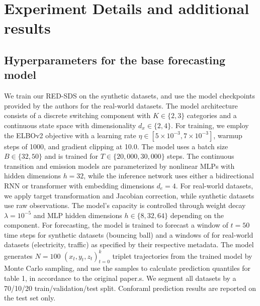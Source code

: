

\newpage
\section{Experiment Details and additional results}
\label{app:exp}

\subsection{Hyperparameters for the base forecasting model}
\label{app:redsds}

We train our RED-SDS on the synthetic datasets, and use the model checkpoints provided by the authors for the real-world datasets. The model architecture consists of a discrete switching component with $K \in \{2,3\}$ categories and a continuous state space with dimensionality $d_x \in \{2,4\}$. For training, we employ the ELBOv2 objective with a learning rate $\eta \in [5\times10^{-3}, 7\times10^{-3}]$, warmup steps of 1000, and gradient clipping at 10.0. The model uses a batch size $B \in \{32,50\}$ and is trained for $T \in \{20,000, 30,000\}$ steps. The continuous transition and emission models are parameterized by nonlinear MLPs with hidden dimensions $h=32$, while the inference network uses either a bidirectional RNN or transformer with embedding dimensions $d_e=4$.  For real-world datasets, we apply target transformation and Jacobian correction, while synthetic datasets use raw observations. The model's capacity is controlled through weight decay $\lambda=10^{-5}$ and MLP hidden dimensions $h \in \{8,32,64\}$ depending on the component. For forecasting, the model is trained to forecast a window of $t = 50$ time steps for synthetic datasets (bouncing ball) and a windows of for real-world datasets (electricity, traffic) as specified by their respective metadata. The model generates $N=100$ $(x_t, y_t, z_t)_{t=0}^k$ triplet trajectories from the trained model by Monte Carlo sampling, and use the samples to calculate prediction quantiles for table 1, in accordance to the original paper.s. We segment all datasets by a 70/10/20 train/validation/test split. Conforaml prediction results are reported on the test set only.

